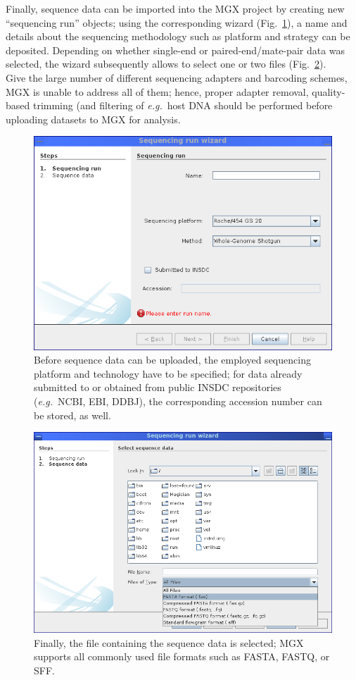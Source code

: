 Finally, sequence data can be imported into the MGX project by creating new ``sequencing run'' objects; using the
corresponding wizard (Fig.~\ref{dnawiz1}), a name and details about the sequencing methodology such as platform
and strategy can be deposited. Depending on whether single-end or paired-end/mate-pair data was selected, the
wizard subsequently allows to select one or two files (Fig.~\ref{dnawiz2}).\\

\noindent
Give the large number of different sequencing adapters and barcoding schemes, MGX is unable to address all of
them; hence, proper adapter removal, quality-based trimming (and filtering of \textit{e.g.}~host DNA should be
performed before uploading datasets to MGX for analysis.\\

\begin{figure}[H]
\centering
\includegraphics[width=.8\textwidth]{img/mgx/runwiz1}
\caption[Sequence import]{Before sequence data can be uploaded, the employed sequencing platform and technology have 
to be specified; for data already submitted to or obtained from public INSDC repositories (\textit{e.g.}~NCBI, EBI, DDBJ), the
corresponding accession number can be stored, as well.}
\label{dnawiz1}
\end{figure}

\begin{figure}[H]
\centering
\includegraphics[width=.8\textwidth]{img/mgx/runwiz2}
\caption[Sequence import]{Finally, the file containing the sequence data is selected; MGX supports all commonly used
file formats such as FASTA, FASTQ, or SFF.}
\label{dnawiz2}
\end{figure}

